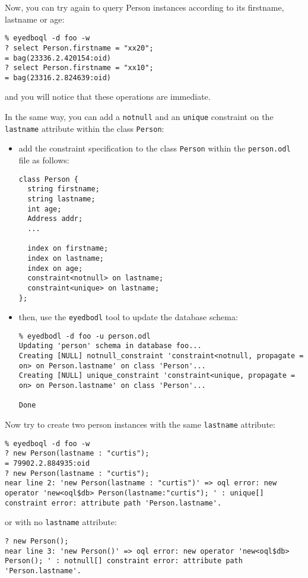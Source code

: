 Now, you can try again to query Person instances according to its
firstname, lastname or age:
\verbsize \begin{verbatim}
% eyedboql -d foo -w
? select Person.firstname = "xx20";
= bag(23336.2.420154:oid)
? select Person.firstname = "xx10";
= bag(23316.2.824639:oid)
\end{verbatim}
\normalsize
and you will notice that these operations are immediate.



In the same way, you can add a \texttt{notnull} and an \texttt{unique} constraint
on the \texttt{lastname} attribute within the class \texttt{Person}:
\begin{itemize}
\item add the constraint specification to the class \texttt{Person} within
the \texttt{person.odl} file as follows:
\verbsize \begin{verbatim}
class Person {
  string firstname;
  string lastname;
  int age;
  Address addr;
  ...

  index on firstname;
  index on lastname;
  index on age;
  constraint<notnull> on lastname;
  constraint<unique> on lastname;
};
\end{verbatim}
\normalsize
\item then, use the \texttt{eyedbodl} tool to update the database schema:
\verbsize \begin{verbatim}
% eyedbodl -d foo -u person.odl
Updating 'person' schema in database foo...
Creating [NULL] notnull_constraint 'constraint<notnull, propagate = on> on Person.lastname' on class 'Person'...
Creating [NULL] unique_constraint 'constraint<unique, propagate = on> on Person.lastname' on class 'Person'...

Done
\end{verbatim}
\normalsize
\end{itemize}

Now try to create two person instances with the same \texttt{lastname} attribute:
\verbsize \begin{verbatim}
% eyedboql -d foo -w
? new Person(lastname : "curtis");
= 79902.2.884935:oid
? new Person(lastname : "curtis");
near line 2: 'new Person(lastname : "curtis")' => oql error: new operator 'new<oql$db> Person(lastname:"curtis"); ' : unique[] constraint error: attribute path 'Person.lastname'.
\end{verbatim} %
\normalsize
or with no \texttt{lastname} attribute:
\verbsize \begin{verbatim}
? new Person();
near line 3: 'new Person()' => oql error: new operator 'new<oql$db> Person(); ' : notnull[] constraint error: attribute path 'Person.lastname'.
\end{verbatim} %
\normalsize



